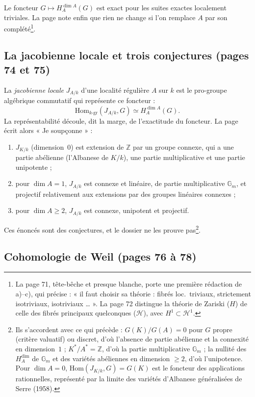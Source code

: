 \documentclass[11pt,a4paper]{article}
\begin{document}
Le foncteur $G \mapsto H^{\dim A}_A(G)$ est exact pour les suites exactes
localement triviales. La page note enfin que rien ne change si l'on remplace $A$
par son complété\footnote{La page 71, tête-bêche et presque blanche, porte une
première rédaction de a)--c), qui précise : « il faut choisir sa théorie :
fibrés loc.\ triviaux, strictement isotriviaux, isotriviaux … ». La page 72
distingue la théorie de Zariski ($H$) de celle des fibrés principaux quelconques
($\mathcal{H}$), avec $H^1 \subset \mathcal{H}^1$.}.

\subsection*{La jacobienne locale et trois conjectures (pages 74 et 75)}

La \emph{jacobienne locale} $J_{A/k}$ d'une localité régulière $A$ sur $k$ est
le pro-groupe algébrique commutatif qui représente ce foncteur :
\[
\mathrm{Hom}_{k\text{-gr}}(J_{A/k}, G) \simeq H^{\dim A}_A(G).
\]
La représentabilité découle, dit la marge, de l'exactitude du foncteur. La page
écrit alors « Je soupçonne » :
\begin{enumerate}
\item[a)] $J_{K/k}$ (dimension~$0$) est extension de $\mathbb{Z}$ par un groupe
connexe, qui a une partie abélienne (l'Albanese de $K/k$), une partie
multiplicative et une partie unipotente ;
\item[b)] pour $\dim A = 1$, $J_{A/k}$ est connexe et linéaire, de partie
multiplicative $\mathbb{G}_m$, et projectif relativement aux extensions par des
groupes linéaires connexes ;
\item[c)] pour $\dim A \geq 2$, $J_{A/k}$ est connexe, unipotent et projectif.
\end{enumerate}
Ces énoncés sont des conjectures, et le dossier ne les prouve pas\footnote{Ils
s'accordent avec ce qui précède : $G(K)/G(A) = 0$ pour $G$ propre (critère
valuatif) ou discret, d'où l'absence de partie abélienne et la connexité en
dimension~$1$ ; $K^{*}/A^{*} = \mathbb{Z}$, d'où la partie multiplicative
$\mathbb{G}_m$ ; la nullité des $H^{\dim}_A$ de $\mathbb{G}_m$ et des variétés
abéliennes en dimension $\geq 2$, d'où l'unipotence. Pour $\dim A = 0$,
$\mathrm{Hom}(J_{K/k}, G) = G(K)$ est le foncteur des applications rationnelles,
représenté par la limite des variétés d'Albanese généralisées de Serre (1958).}.

\subsection*{Cohomologie de Weil (pages 76 à 78)}
\end{document}
